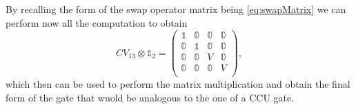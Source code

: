 {\begin{equation}
    \end{equation}
    By recalling the form of the swap operator matrix being \eqref{eq:swapMatrix} we can perform now all the computation to obtain
    \begin{equation}
        CV_{13}\otimes\mathbb{1}_2 = \begin{pmatrix}
            \mathbb{1} & \mathbb{0} & \mathbb{0} & \mathbb{0}\\
            \mathbb{0} & \mathbb{1} & \mathbb{0} & \mathbb{0}\\
            \mathbb{0} & \mathbb{0} & V & \mathbb{0}\\
            \mathbb{0} & \mathbb{0} & \mathbb{0} & V\\
        \end{pmatrix},
    \end{equation}
    which then can be used to perform the matrix multiplication and obtain the final form of the gate that wuold be analogous to the one of a CCU gate.
}